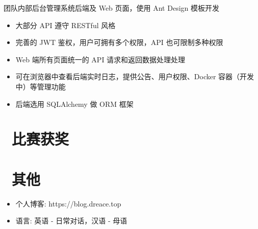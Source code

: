 \documentclass{resume}
\begin{document}
\begin{onehalfspacing}
  团队内部后台管理系统后端及 Web 页面，使用 Ant Design 模板开发
  \begin{itemize}
    \item 大部分 API 遵守 RESTful 风格
    \item 完善的 JWT 鉴权，用户可拥有多个权限，API 也可限制多种权限
    \item Web 端所有页面统一的 API 请求和返回数据处理处理
    \item 可在浏览器中查看后端实时日志，提供公告、用户权限、Docker 容器（开发中）等管理功能
    \item 后端选用 SQLAlchemy 做 ORM 框架
  \end{itemize}
\end{onehalfspacing}

\section{\faHeartO\ 比赛获奖}

\section{\faInfo\ 其他}
\begin{itemize}[parsep=0.5ex]
  \item 个人博客: https://blog.dreace.top
  \item 语言: 英语 - 日常对话，汉语 - 母语
\end{itemize}
\end{document}
